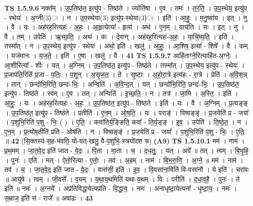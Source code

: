 \documentclass[17pt]{extarticle}
\begin{document}
                  \newline
                                \textbf{ TS 1.5.9.6} \newline
                  नक्त᳚म् । उ॒प॒तिष्ठ॑त॒ इत्यु॑प - तिष्ठ॑ते । ज्योति॑षा । ए॒व । तमः॑ । त॒र॒ति॒ । उ॒प॒स्थेय॒ इत्यु॑प - स्थेयः॑ । अ॒ग्नी(3)ः । न । उ॒प॒स्थेया(3) इत्यु॑प-स्थेया(3)ः । इति॑ । आ॒हुः॒ । म॒नु॒ष्या॑य । इत् । नु । वै । यः । अह॑रह॒रित्यहः॑ - अ॒हः॒ । आ॒हृत्येत्या᳚ - हृत्य॑ । अथ॑ । ए॒न॒म् । याच॑ति । सः । इत् । नु । वै । तम् । उपेति॑ । ऋ॒च्छ॒ति॒ । अथ॑ । कः । दे॒वान् । अह॑रह॒रित्यहः॑-अ॒हः॒ । या॒चि॒ष्य॒ति॒ । इति॑ । तस्मा᳚त् । न । उ॒प॒स्थेय॒ इत्यु॑प - स्थेयः॑ । अथो॒ इति॑ । खलु॑ । आ॒हुः॒ । आ॒शिष॒ इत्या᳚ - शिषे᳚ । वै । कम् । यज॑मानः । य॒ज॒ते॒ । इति॑ । ए॒षा । खलु॑ । वै । \textbf{  41} \newline
                  \newline
                                \textbf{ TS 1.5.9.7} \newline
                  आहि॑ताग्ने॒रित्याहि॑त-अ॒ग्नेः॒ । आ॒शीरित्या᳚ - शीः । यत् । अ॒ग्निम् । उ॒प॒तिष्ठ॑त॒ इत्यु॑प - तिष्ठ॑ते । तस्मा᳚त् । उ॒प॒स्थेय॒ इत्यु॑प - स्थेयः॑ । प्र॒जाप॑ति॒रिति॑ प्र॒जा - प॒तिः॒ । प॒शून् । अ॒सृ॒ज॒त॒ । ते । सृ॒ष्टाः । अ॒हो॒रा॒त्रे इत्य॑हः - रा॒त्रे । प्रेति॑ । अ॒वि॒श॒न्न् । तान् । छन्दो॑भि॒रिति॒ छन्दः॑-भिः॒ । अन्विति॑ । अ॒वि॒न्द॒त् । यत् । छन्दो॑भि॒रिति॒ छन्दः॑-भिः॒ । उ॒प॒तिष्ठ॑त॒ इत्यु॑प - तिष्ठ॑ते । स्वम् । ए॒व । तत् । अन्विति॑ । इ॒च्छ॒ति॒ । न । तत्र॑ । जा॒मि । अ॒स्ति॒ । इति॑ । आ॒हुः॒ । यः । अह॑रह॒रित्यहः॑ - अ॒हः॒ । उ॒प॒तिष्ठ॑त॒ इत्यु॑प - तिष्ठ॑ते । इति॑ । यः । वै । अ॒ग्निम् । प्र॒त्यङ्ङ् । उ॒प॒तिष्ठ॑त॒ इत्यु॑प - तिष्ठ॑ते । प्रतीति॑ । ए॒न॒म् । ओ॒ष॒ति॒ । यः । पराङ्॑ । विष्वङ्ङ्॑ । प्र॒जयेति॑ प्र - जया᳚ । प॒शुभि॒रिति॑ प॒शु - भिः॒ ( ) । ए॒ति॒ । कवा॑तिर्य॒ङ्ङिति॒ कवा᳚ - ति॒र्य॒ङ्ङ् । इ॒व॒ । उपेति॑ । ति॒ष्ठे॒त॒ । न । ए॒न॒म् । प्र॒त्योष॒तीति॑ प्रति - ओष॑ति । न । विष्वङ्ङ्॑ । प्र॒जयेति॑ प्र - जया᳚ । प॒शुभि॒रिति॑ प॒शु - भिः॒ । ए॒ति॒ ॥ \textbf{  42} \newline
                  \newline
                      (सि॒क्तस्य॑-स॒ह-भ॑वति॒-यो-यत्-खलु॒ वै-प॒शुभि॒-स्त्रयो॑दश च)  \textbf{(A9)} \newline \newline
                                \textbf{ TS 1.5.10.1} \newline
                  मम॑ । नाम॑ । प्र॒थ॒मम् । जा॒त॒वे॒द॒ इति॑ जात - वे॒दः॒ । पि॒ता । मा॒ता । च॒ । द॒ध॒तुः॒ । यत् । अग्रे᳚ ॥ तत् । त्वम् । बि॒भृ॒हि॒ । पुनः॑ । एति॑ । मत् । ऐतो॒रित्या - ए॒तोः॒ । तव॑ । अ॒हम् । नाम॑ । बि॒भ॒रा॒णि॒ । अ॒ग्ने॒ ॥ मम॑ । नाम॑ । तव॑ । च॒ । जा॒त॒वे॒द॒ इति॑ जात - वे॒दः॒ । वास॑सी॒ इति॑ । इ॒व॒ । वि॒वसा॑ना॒विति॑ वि-वसा॑नौ । ये इति॑ । चरा॑वः ॥ आयु॑षे । त्वम् । जी॒वसे᳚ । व॒यम् । य॒था॒य॒थमिति॑ यथा-य॒थम् । वि । परीति॑ । द॒धा॒व॒है॒ । पुनः॑ । ते इति॑ ॥ नमः॑ । अ॒ग्नये᳚ । अप्र॑तिविद्धा॒येत्यप्र॑ति - वि॒द्धा॒य॒ । नमः॑ । अना॑धृष्टा॒येत्यना᳚ - धृ॒ष्टा॒य॒ । नमः॑ । स॒म्राज॒ इति॑ सं - राजे᳚ ॥ अषा॑ढः । \textbf{  43} \newline
\end{document}
